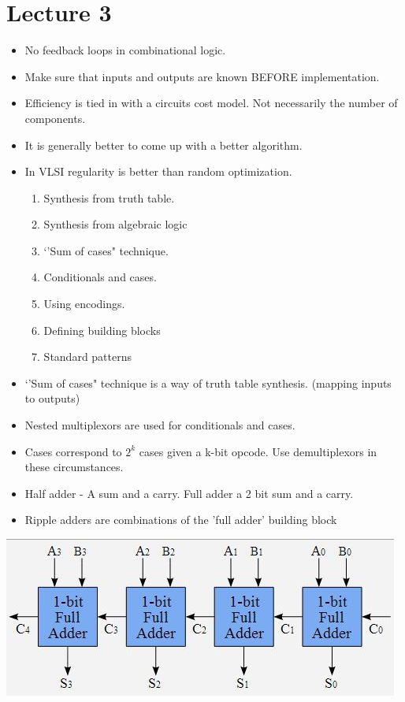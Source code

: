 \documentclass{article}
\begin{document}
\section*{Lecture 3}
\begin{itemize}
\item No feedback loops in combinational logic.
\item Make sure that inputs and outputs are known BEFORE implementation.
\item Efficiency is tied in with a circuits cost model. Not necessarily the number of components.
\item It is generally better to come up with a better algorithm.
\item In VLSI regularity is better than random optimization.
\begin{enumerate}
\item Synthesis from truth table.
\item Synthesis from algebraic logic
\item `'Sum of cases" technique.
\item Conditionals and cases.
\item Using encodings.
\item Defining building blocks
\item Standard patterns
\end{enumerate}
\item `'Sum of cases" technique is a way of truth table synthesis. (mapping inputs to outputs)
\item Nested multiplexors are used for conditionals and cases.
\item Cases correspond to $2^k$ cases given a k-bit opcode. Use demultiplexors in these circumstances.
\item Half adder - A sum and a carry. Full adder a 2 bit sum and a carry.
\item Ripple adders are combinations of the 'full adder' building block
\end{itemize}
\includegraphics[width=\linewidth]{rippleadd}
\end{document}
